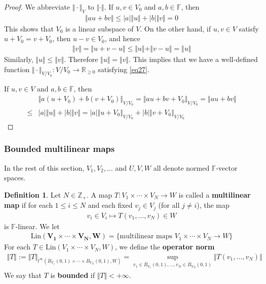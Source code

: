 \documentclass[12pt,b5paper,notitlepage]{article}
\theoremstyle{definition}
\newtheorem{df}{Definition}[subsection]
\theoremstyle{plain}
\newcommand{\ovl}{\overline}
\newcommand{\Zbb}{\mathbb Z}
\newcommand{\Rbb}{\mathbb R}
\newcommand{\Fbb}{\mathbb F}
\newcommand{\Lin}{\mathrm{Lin}}
\numberwithin{equation}{section}
\begin{document}
\begin{proof}
We abbreviate $\Vert\cdot\Vert_V$ to $\Vert\cdot\Vert$. If $u,v\in V_0$ and $a,b\in\Fbb$, then
\begin{align*}
\Vert au+bv\Vert\leq |a|\Vert u\Vert+|b|\Vert v\Vert=0
\end{align*}
This shows that $V_0$ is a linear subspace of $V$. On the other hand, if $u,v\in V$ satisfy $u+V_0=v+V_0$, then $u-v\in V_0$, and hence
\begin{align*}
\Vert v\Vert=\Vert u+v-u\Vert\leq\Vert u\Vert+\Vert v-u\Vert=\Vert u\Vert
\end{align*}
Similarly, $\Vert u\Vert\leq\Vert v\Vert$. Therefore $\Vert u\Vert=\Vert v\Vert$. This implies that we have a well-defined function $\Vert\cdot\Vert_{V/V_0}:V/V_0\rightarrow\Rbb_{\geq0}$ satisfying \eqref{eq27}.

If $u,v\in V$ and $a,b\in\Fbb$, then
\begin{align*}
&\Vert a(u+V_0)+b(v+V_0)\Vert_{V/V_0}=\Vert au+bv+V_0\Vert_{V/V_0}=\Vert au+bv\Vert\\
\leq& |a|\Vert u\Vert+|b|\Vert v\Vert=|a|\Vert u+V_0\Vert_{V/V_0}+|b|\Vert v+V_0\Vert_{V/V_0}
\end{align*}
\end{proof}








\subsubsection{Bounded multilinear maps}

In the rest of this section,  $V_1,V_2,\dots$ and $U,V,W$ all denote normed $\Fbb$-vector spaces.

\begin{df}
Let $N\in\Zbb_+$. A map $T:V_1\times\cdots\times V_N\rightarrow W$ is called a \textbf{multilinear map}  if for each $1\leq i\leq N$ and each fixed $v_j\in V_j$ (for all $j\neq i$), the map
\begin{align*}
v_i\in V_i\mapsto T(v_1,\dots,v_N)\in W
\end{align*}
is $\Fbb$-linear. We let \index{Lin@$\Lin(V_1\times\cdots\times V_N,W)$}
\begin{align*}
\pmb{\Lin(V_1\times\cdots\times V_N,W)}=\{\text{multilinear maps }V_1\times\cdots\times V_N\rightarrow W\}
\end{align*}
For each $T\in \Lin(V_1\times\cdots\times V_N,W)$, we define the \textbf{operator norm}
\begin{align*}
\Vert T\Vert:=\Vert T\Vert_{l^\infty(\ovl B_{V_1}(0,1)\times\cdots\times\ovl B_{V_N}(0,1),W)}=\sup_{v_1\in\ovl B_{V_1}(0,1),\dots,v_N\in\ovl B_{V_N}(0,1)}\Vert T(v_1,\dots,v_N)\Vert
\end{align*}
We say that $T$ is \textbf{bounded}  if $\Vert T\Vert<+\infty$. 
\end{df}
\end{document}
